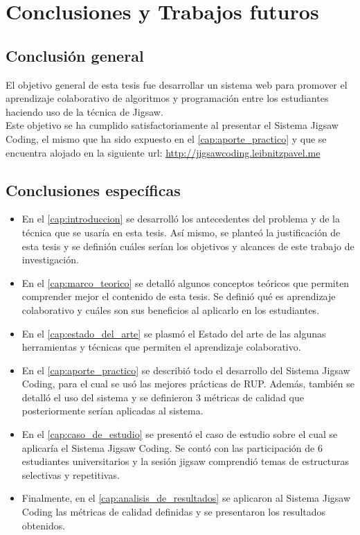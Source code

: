 \chapter{Conclusiones y Trabajos futuros}
\section{Conclusión general}
El objetivo general de esta tesis fue desarrollar un sistema web para promover el aprendizaje colaborativo de algoritmos y programación entre los estudiantes haciendo uso de la técnica de Jigsaw. \\

Este objetivo se ha cumplido satisfactoriamente al presentar el Sistema Jigsaw Coding, el mismo que ha sido expuesto en el \autoref{cap:aporte_practico} y que se encuentra alojado en la siguiente url: \url{http://jigsawcoding.leibnitzpavel.me} 
\section{Conclusiones específicas}
\begin{itemize}
	\item En el \autoref{cap:introduccion} se desarrolló los antecedentes del problema y de la técnica que se usaría en esta tesis. Así mismo, se planteó la justificación de esta tesis y se definión cuáles serían los objetivos y alcances de este trabajo de investigación.
	\item En el \autoref{cap:marco_teorico} se detalló algunos conceptos teóricos que permiten comprender mejor el contenido de esta tesis. Se definió qué es aprendizaje colaborativo y cuáles son sus beneficios al aplicarlo en los estudiantes.
	\item En el \autoref{cap:estado_del_arte} se plasmó el Estado del arte de las algunas herramientas y técnicas que permiten el aprendizaje colaborativo. 
	\item En el \autoref{cap:aporte_practico} se describió todo el desarrollo del Sistema Jigsaw Coding, para el cual se usó las mejores prácticas de RUP. Además, también se detalló el uso del sistema y se definieron 3 métricas de calidad que posteriormente serían aplicadas al sistema.
	\item En el \autoref{cap:caso_de_estudio} se presentó el caso de estudio sobre el cual se aplicaría el Sistema Jigsaw Coding. Se contó con las participación de 6 estudiantes universitarios y la sesión jigsaw comprendió temas de estructuras selectivas y repetitivas.
	\item Finalmente, en el \autoref{cap:analisis_de_resultados} se aplicaron al Sistema Jigsaw Coding las métricas de calidad definidas y se presentaron los resultados obtenidos.
\end{itemize}

